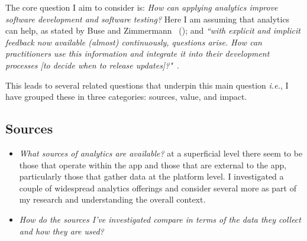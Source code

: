 The core question I aim to consider is: 
\emph{How can applying analytics improve software development and software testing?} Here I am assuming that analytics can help, as stated by Buse and Zimmermann ~(\citeyear{buse_analytics_2010}); and \emph{``with explicit and implicit feedback now available (almost) continuously, questions arise. How can practitioners use this information and integrate it into their development processes [to decide when to release updates]?"}~\citep{maalej2016_towards_data_driven_requirements_engineering}.

This leads to several related questions that underpin this main question \emph{i.e.}, I have grouped these in three categories: sources, value, and impact.





\subsection{Sources}
\begin{itemize}
    \item \emph{What sources of analytics are available?} at a superficial level there seem to be those that operate within the app and those that are external to the app, particularly those that gather data at the platform level. I investigated a couple of widespread analytics offerings and consider several more as part of my research and understanding the overall context.
    \item \emph{How do the sources I've investigated compare in terms of the data they collect and how they are used?}
\end{itemize}

